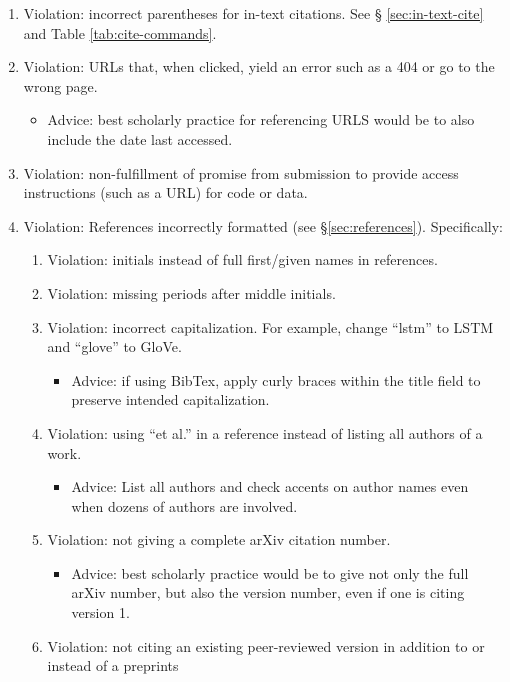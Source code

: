 \documentclass[11pt,a4paper]{article}
\begin{document}
\begin{enumerate}
\item Violation: incorrect parentheses for in-text citations.  See \S
\ref{sec:in-text-cite} and Table \ref{tab:cite-commands}.
\item Violation: URLs that, when clicked, yield an error such as a 404 or go
to the wrong page.
  \begin{itemize}
     \item Advice: best scholarly practice for referencing URLS would be to also
     include the date last accessed.
  \end{itemize}
\item Violation: non-fulfillment of promise from submission to provide access
instructions (such as a URL) for code or data.
\item Violation: References incorrectly formatted (see \S\ref{sec:references}).
Specifically:
\begin{enumerate}
  \item Violation: initials instead of full first/given names in references.
  \item Violation: missing periods after middle initials.
  \item Violation: incorrect capitalization.  For example, change ``lstm'' to
  LSTM and ``glove'' to GloVe.
  \begin{itemize}
    \item Advice: if using BibTex, apply curly braces within the title field to
    preserve intended capitalization.
  \end{itemize}
  \item Violation: using ``et al.'' in a reference instead of listing all
  authors of a work.
  \begin{itemize}
    \item Advice: List all authors and check accents on author names even when
    dozens of authors are involved.
  \end{itemize}
  \item Violation: not giving a complete arXiv citation number.
  \begin{itemize}
     \item Advice: best scholarly practice would be to give not only the full
     arXiv number, but also the version number, even if one is citing version 1.
  \end{itemize}
  \item Violation: not citing an existing peer-reviewed version in addition to
  or instead of a preprints
    \begin{itemize}

\end{itemize}
\end{enumerate}
\end{enumerate}
\end{document}
